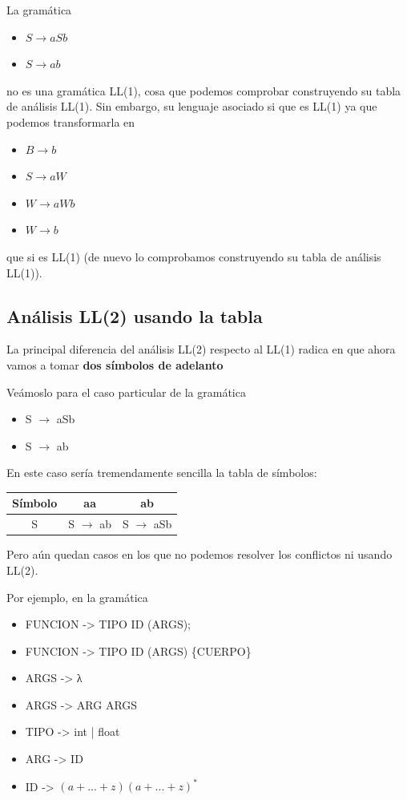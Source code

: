 \documentclass{apuntes}
\begin{document}
\begin{example}
La gramática
\begin{itemize}
\item $ S \rightarrow aSb$
\item $ S\rightarrow ab$
\end{itemize}
no es una gramática LL(1), cosa que podemos comprobar construyendo su tabla de análisis LL(1). Sin embargo, su lenguaje asociado si que es LL(1) ya que podemos transformarla en
\begin{itemize}
\item $ B \rightarrow b$
\item $ S \rightarrow aW$
\item $ W \rightarrow aWb$
\item $ W \rightarrow b$
\end{itemize}
que si es LL(1) (de nuevo lo comprobamos construyendo su tabla de análisis LL(1)).
\end{example}


\subsection{Análisis LL(2) usando la tabla}
La principal diferencia del análisis LL(2) respecto al LL(1) radica en que ahora vamos a tomar \textbf{dos símbolos de adelanto}

Veámoslo para el caso particular de la gramática
\begin{itemize}
\item S $\rightarrow$ aSb
\item S $\rightarrow$ ab
\end{itemize}

En este caso sería tremendamente sencilla la tabla de símbolos:
\begin{center}
\begin{tabular}{| c | c | c |}
\hline
Símbolo & aa & ab \\
\hline
S &  S $\rightarrow$ ab &  S $\rightarrow$ aSb \\
\hline
\end{tabular}
\end{center}


Pero aún quedan casos en los que no podemos resolver los conflictos ni usando LL(2).

Por ejemplo, en la gramática
\begin{itemize}
\item FUNCION -> TIPO ID (ARGS);
\item FUNCION -> TIPO ID (ARGS) \{CUERPO\}
\item ARGS -> λ
\item ARGS -> ARG ARGS
\item TIPO -> int | float
\item ARG -> ID
\item ID -> $(a+...+z)(a+...+z)^*$
\end{itemize}
\end{document}
